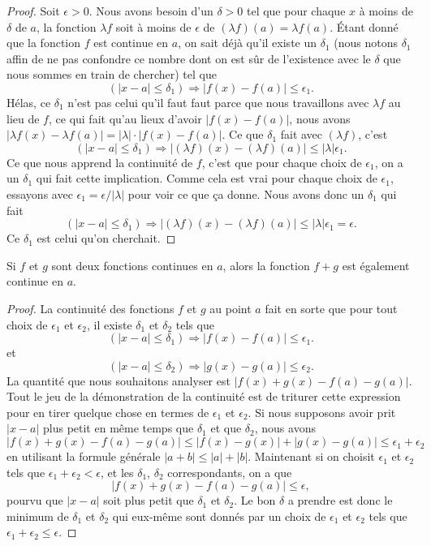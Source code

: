 \begin{proof}
Soit $\epsilon>0$. Nous avons besoin d'un $\delta>0$ tel que pour chaque $x$ à moins de $\delta$ de $a$, la fonction $\lambda f$ soit à moins de $\epsilon$ de $(\lambda f)(a)=\lambda f(a)$. Étant donné que la fonction $f$ est continue en $a$, on sait déjà qu'il existe un $\delta_1$ (nous notons $\delta_1$ affin de ne pas confondre ce nombre dont on est sûr de l'existence avec le $\delta$ que nous sommes en train de chercher) tel que 
\[ 
  (| x-a |\leq \delta_1)\Rightarrow | f(x)-f(a) |\leq \epsilon_1.
\]
Hélas, ce $\delta_1$ n'est pas celui qu'il faut faut parce que nous travaillons avec $\lambda f$ au lieu de $f$, ce qui fait qu'au lieux d'avoir $| f(x)-f(a) |$, nous avons $| \lambda f(x)-\lambda f(a) |=| \lambda |\cdot | f(x)-f(a) |$.  Ce que $\delta_1$ fait avec $(\lambda f)$, c'est
\[ 
  (| x-a |\leq\delta_1)\Rightarrow  | (\lambda f)(x)- (\lambda f)(a)|\leq | \lambda |\epsilon_1.
\]
Ce que nous apprend la continuité de $f$, c'est que pour chaque choix de $\epsilon_1$, on a un $\delta_1$ qui fait cette implication. Comme cela est vrai pour chaque choix de $\epsilon_1$, essayons avec $\epsilon_1=\epsilon/| \lambda |$ pour voir ce que ça donne. Nous avons donc un $\delta_1$ qui fait
\[ 
  (| x-a |\leq\delta_1)\Rightarrow  | (\lambda f)(x)- (\lambda f)(a)|\leq | \lambda |\epsilon_1=\epsilon.
\]
Ce $\delta_1$ est celui qu'on cherchait. 
\end{proof}

\begin{theorem}
Si $f$ et $g$ sont deux fonctions continues en $a$, alors la fonction $f+g$ est également continue en $a$.
\end{theorem}

\begin{proof}
La continuité des fonctions $f$ et $g$ au point $a$ fait en sorte que pour tout choix de $\epsilon_1$ et $\epsilon_2$, il existe $\delta_1$ et $\delta_2$ tels que 
\[ 
  (| x-a |\leq \delta_1)\Rightarrow | f(x)-f(a) |\leq \epsilon_1.
\]
et
\[ 
  (| x-a |\leq \delta_2)\Rightarrow | g(x)-g(a) |\leq \epsilon_2.
\]
La quantité que nous souhaitons analyser est $| f(x)+g(x)-f(a)-g(a) |$. Tout le jeu de la démonstration de la continuité est de triturer cette expression pour en tirer quelque chose en termes de $\epsilon_1$ et $\epsilon_2$. Si nous supposons avoir prit $| x-a |$ plus petit en même temps que $\delta_1$ et que $\delta_2$, nous avons
\[
| f(x)+g(x)-f(a)-g(a) |\leq| f(x)-g(x) |+| g(x)-g(a) |\leq\epsilon_1+\epsilon_2 
\]
en utilisant la formule générale $| a+b |\leq | a |+| b |$. Maintenant si on choisit $\epsilon_1$ et $\epsilon_2$ tels que $\epsilon_1+\epsilon_2<\epsilon$, et les $\delta_1$, $\delta_2$ correspondants, on a que 
\[
| f(x)+g(x)-f(a)-g(a) |\leq\epsilon,
\]
pourvu que $| x-a |$ soit plus petit que $\delta_1$ et $\delta_2$. Le bon $\delta$ a prendre est donc le minimum de $\delta_1$ et $\delta_2$ qui eux-même sont donnés par un choix de $\epsilon_1$ et $\epsilon_2$ tels que $\epsilon_1+\epsilon_2\leq\epsilon$.
\end{proof}


